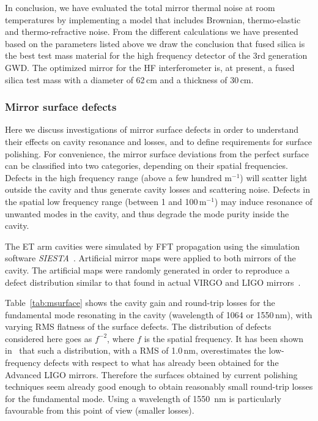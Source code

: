 In conclusion, we have evaluated the total mirror thermal noise at room temperatures by implementing a model that includes Brownian, thermo-elastic and thermo-refractive noise. From the different calculations we have presented based on the parameters listed above we draw the conclusion that fused silica is the best test mass material for the high frequency detector of the 3rd generation GWD. The optimized mirror for the HF interferometer is, at present, a fused silica test mass with a diameter of 62\,cm and a thickness of 30\,cm.

\subsubsection{Mirror surface defects}
\label{sec:msurface}


Here we discuss investigations of mirror surface defects in order to understand their effects on cavity resonance and losses, and to define requirements for surface polishing. For convenience, the mirror surface deviations from the perfect surface can be classified into two categories, depending on their spatial frequencies. Defects in the high frequency range (above a few hundred m$^{-1}$) will scatter light outside the cavity and thus generate cavity losses and scattering noise. Defects in the spatial low frequency range (between 1 and 100\,m$^{-1}$) may induce resonance of unwanted modes in the cavity, and thus degrade the mode purity inside the cavity.
 
The ET arm cavities were simulated by FFT propagation using the simulation software \emph{SIESTA}~\cite{Caron1999}. Artificial mirror maps were applied to both mirrors of the cavity. The artificial maps were randomly generated in order to reproduce a defect distribution similar to that found in actual VIRGO and LIGO mirrors~\cite{Galimberti2010a, Galimberti2010, Galimberti2010b}.  

Table~\ref{tab:msurface} shows the cavity gain and round-trip losses for the fundamental mode resonating in the cavity (wavelength of 1064 or 1550\,nm), with varying RMS flatness of the surface defects. The distribution of defects considered here goes as $f^{-2}$, where $f$ is the spatial frequency. It has been shown in~\cite{Galimberti2010b} that such a distribution, with a RMS of 1.0\,nm, overestimates the low-frequency defects with respect to what has already been obtained for the Advanced LIGO mirrors. Therefore the surfaces obtained by current polishing techniques seem already good enough to obtain reasonably small round-trip losses for the fundamental mode. Using a wavelength of 1550~nm is particularly favourable from this point of view (smaller losses).
 
